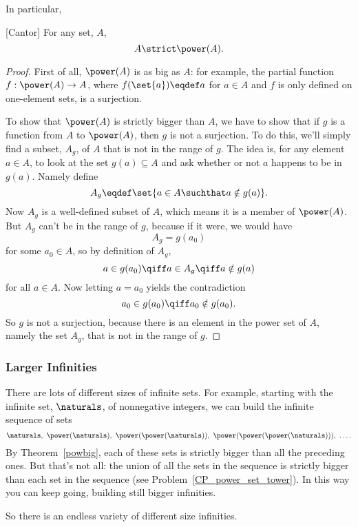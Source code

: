 In particular,
\begin{theorem}\label{powbig}[Cantor]\mbox{}
For any set, $A$,
\[
A \strict \power(A).
\]
\end{theorem}
\begin{proof}
  First of all, $\power(A)$ is as big as $A$: for example, the partial
  function $f:\power(A) \to A$, where $f(\set{a}) \eqdef a$ for $a \in A$
  and $f$ is only defined on one-element sets, is a surjection.

  To show that $\power(A)$ is strictly bigger than $A$, we have to
  show that if $g$ is a function from $A$ to $\power(A)$, then $g$ is
  not a surjection.  To do this, we'll simply find a subset, $A_g$, of
  $A$ that is not in the range of $g$.  The idea is, for any element
  $a \in A$, to look at the set $g(a) \subseteq A$ and ask whether or
  not $a$ happens to be in $g(a)$.  Namely define \iffalse mimicking
  Russell's Paradox,\fi
  \[
  A_g \eqdef \set{a \in A \suchthat a \notin g(a)}.
  \]
  Now $A_g$ is a well-defined subset of $A$, which means it is a member of
  $\power(A)$.  But $A_g$ can't be in the range of $g$, because if it
  were, we would have
\[
A_g = g(a_0)
\]
for some $a_0 \in A$, so by definition of $A_g$,
\[
a \in g(a_0) \qiff a \in A_g \qiff a \notin g(a)
\]
for all $a \in A$.  Now letting $a = a_0$ yields the contradiction
\[
a_0 \in g(a_0) \qiff a_0 \notin g(a_0).
\]
So $g$ is not a surjection, because there is an element in the power set
of $A$, namely the set $A_g$, that is not in the range of $g$.
\end{proof}

\subsubsection{Larger Infinities}

There are lots of different sizes of infinite sets.  For example, starting
with the infinite set, $\naturals$, of nonnegative integers, we can build
the infinite sequence of sets
\[
\naturals,\ \power(\naturals),\ \power(\power(\naturals)),\
\power(\power(\power(\naturals))),\ \dots.
\]
By Theorem~\ref{powbig}, each of these sets is strictly bigger than all
the preceding ones.  But that's not all: the union of all the sets in the
sequence is strictly bigger than each set in the sequence
(see Problem~\ref{CP_power_set_tower}).  In this way you can keep going,
building still bigger infinities.

So there is an endless variety of different size infinities.

